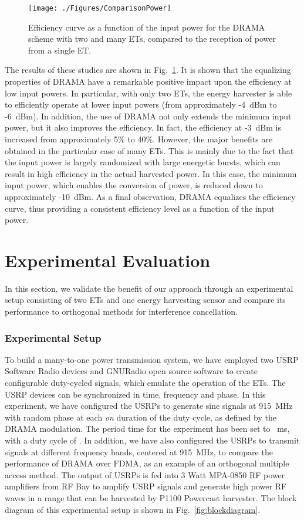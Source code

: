 \documentclass[conference]{IEEEtran}
\begin{document}
\begin{figure}
  \centering
    \texttt{[image: ./Figures/ComparisonPower]}
 \caption{Efficiency curve as a function of the input power for the DRAMA scheme with two and many ETs, compared to the reception of power from a single ET.}
 \label{fig:Powercast}
 \vspace{0.0 cm}
\end{figure}

The results of these studies are shown in Fig.~\ref{fig:Powercast}. It is shown that the equalizing properties of DRAMA have a remarkable positive impact upon the efficiency at low input powers. In particular, with only two ETs, the energy harvester is able to efficiently operate at lower input powers (from approximately -4~dBm to -6~dBm). In addition, the use of DRAMA not only extends the minimum input power, but it also improves the efficiency. In fact, the efficiency at -3~dBm is increased from approximately 5\% to 40\%. 
However, the major benefits are obtained in the particular case of many ETs. This is mainly due to the fact that the input power is largely randomized with large energetic bursts, which can result in high efficiency in the actual harvested power. In this case, the minimum input power, which enables the conversion of power, is reduced down to approximately -10~dBm.
As a final observation, DRAMA equalizes the efficiency curve, thus providing a consistent efficiency level as a function of the input power. 

\section{Experimental Evaluation}
In this section, we validate the benefit of our approach through an experimental setup consisting of two ETs and one energy harvesting sensor and compare its performance to orthogonal methods for interference cancellation. 

\subsubsection{Experimental Setup}
To build a many-to-one power transmission system, we have employed two USRP Software Radio \cite{ettus} devices and GNURadio open source software to create configurable duty-cycled signals, which emulate the operation of the ETs. 
The USRP devices can be synchronized in time, frequency and phase. In this experiment, we have configured the USRPs to generate sine signals at 915~MHz with random phase at each {\em on} duration of the duty cycle, as defined by the DRAMA modulation. The period time for the experiment has been set to ~ms, with a duty cycle of .
In addition, we have also configured the USRPs to transmit signals at different frequency bands, centered at 915~MHz, to compare the performance of DRAMA over FDMA, as an example of an orthogonal multiple access method.
The output of USRPs is fed into 3 Watt MPA-0850 RF power amplifiers from RF Bay \cite{rfbay} to amplify USRP signals and generate high power RF waves in a range that can be harvested by P1100 Powercast harvester.
The block diagram of this experimental setup is shown in Fig.~\ref{fig:blockdiagram}.
\end{document}
